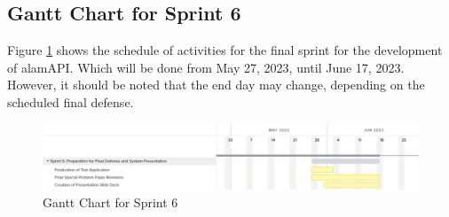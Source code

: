 \subsection{Gantt Chart for Sprint 6}
\label{subsec:gantt_chart_sprint6}
Figure \ref{fig:gantt_chart_sprint6} shows the schedule of activities for the final sprint 
for the development of alamAPI. Which will be done from May 27, 2023, 
until June 17, 2023. However, it should be noted that the end day may change, 
depending on the scheduled final defense.
\begin{figure}[ht]
    \centering
    \includegraphics[width=1\textwidth]{./assets/Gantt_Chart_Sprint6.png}
    \caption{Gantt Chart for Sprint 6}
    \label{fig:gantt_chart_sprint6}
\end{figure}
\FloatBarrier